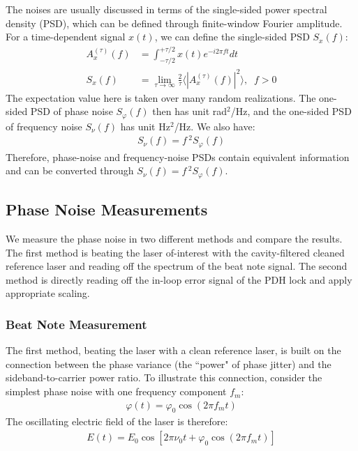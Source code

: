 \documentclass[11pt]{report}
\begin{document}
The noises are usually discussed in terms of the single-sided power spectral density (PSD), which can be defined through finite-window Fourier amplitude. For a time-dependent signal $x(t)$, we can define the single-sided PSD  $ S_x(f)$:
\begin{align}
    A_x^{(\tau)}(f) &= \int_{-\tau/2}^{+\tau/2} x(t) e^{-i2\pi ft} dt\\
    S_x(f) &= \lim_{\tau \to \infty} \frac{2}{\tau} \langle |A_x^{(\tau)}(f)|^2 \rangle ,\;\; f>0
\end{align}
The expectation value here is taken over many random realizations. The one-sided PSD of phase noise $S_\varphi(f)$ then has unit rad$^2$/Hz, and the one-sided PSD of frequency noise $S_\nu(f)$ has unit Hz$^2$/Hz. We also have:
\begin{align}
    S_\nu(f) = f\,^2 S_\varphi(f)
\end{align}
Therefore, phase-noise and frequency-noise PSDs contain equivalent information and can be converted through $S_\nu(f) = f\,^2 S_\varphi(f)$.

\subsection{Phase Noise Measurements}
\label{subsec:phasenoise}

We measure the phase noise in two different methods \cite{Schmid19} and compare the results.  The first method is beating the laser of-interest with the cavity-filtered cleaned reference laser and reading off the spectrum of the beat note signal. The second method is directly reading off the in-loop error signal of the PDH lock and apply appropriate scaling.

\subsubsection{Beat Note Measurement}

The first method, beating the laser with a clean reference laser, is built on the connection between the phase variance (the ``power" of phase jitter) and the sideband-to-carrier power ratio. To illustrate this connection, consider the simplest phase noise with one frequency component $f_m$: 
\begin{align}
    \varphi(t) = \varphi_0 \cos(2\pi f_mt)
\end{align}
The oscillating electric field of the laser is therefore:
\begin{align}
    E(t) = E_0 \cos[2\pi\nu_0t + \varphi_0 \cos(2\pi f_mt)] \label{eqn:sing_phase_E}
\end{align}
\end{document}
